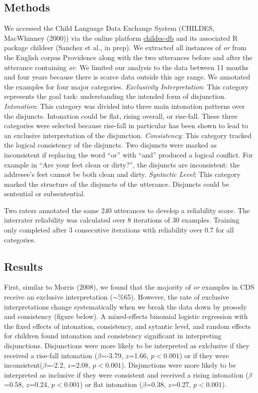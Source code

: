 \documentclass[10pt, letterpaper]{article}
\begin{document}
\subsection{Methods}\label{methods-1}

We accessed the Child Language Data Exchange System (CHILDES, MacWhinney
(2000)) via the online platform
\href{http://childes-db.stanford.edu/}{childes-db} and its associated R
package childesr (Sanchez et al., in prep). We extracted all instances
of \emph{or} from the English corpus Providence along with the two
utterances before and after the utterance containing \emph{or}. We
limited our analysis to the data between 11 months and four years
because there is scarce data outside this age range. We annotated the
examples for four major categories. \emph{Exclusivity Interpretation}:
This category represents the goal task: understanding the intended form
of disjunction. \emph{Intonation}: This category was divided into three
main intonation patterns over the disjuncts. Intonation could be flat,
rising overall, or rise-fall. These three categories were selected
because rise-fall in particular has been shown to lead to an exclusive
interpretation of the disjunction. \emph{Consistency}: This category
tracked the logical consistency of the disjuncts. Two disjuncts were
marked as inconsistent if replacing the word ``or'' with ``and''
produced a logical conflict. For example in ``Are your feet clean or
dirty?'', the disjuncts are inconsistent: the addresee's feet cannot be
both clean and dirty. \emph{Syntactic Level}: This category marked the
structure of the disjuncts of the utterance. Disjuncts could be
sentential or subsentential.

Two raters annotated the same 240 utterances to develop a reliability
score. The interrater reliability was calculated over 8 iterations of 30
examples. Training only completed after 3 consecutive iterations with
reliability over 0.7 for all categories.

\subsection{Results}\label{results-1}

First, similar to Morris (2008), we found that the majority of \emph{or}
examples in CDS receive an exclusive interpretation (\(\sim\)\%65).
However, the rate of exclusive interpretations change systematically
when we break the data down by prosody and consistency (figure below). A
mixed-effects binomial logistic regression with the fixed effects of
intonation, consistency, and sytantic level, and random effects for
children found intonation and consistency significant in interpreting
disjunctions. Disjunctions were more likely to be interpreted as
exlclusive if they received a rise-fall intonation (\(\beta\)=-3.79,
\(z\)=1.66, \(p < 0.001\)) or if they were inconsistent(\(\beta\)=-2.2,
\(z\)=2.08, \(p < 0.001\)). Disjunctions were more likely to be
interpreted as inclusive if they were consistent and received a rising
intonation (\(\beta\)=0.58, \(z\)=0.24, \(p < 0.001\)) or flat
intonation (\(\beta\)=0.38, \(z\)=0.27, \(p < 0.001\)).
\end{document}
